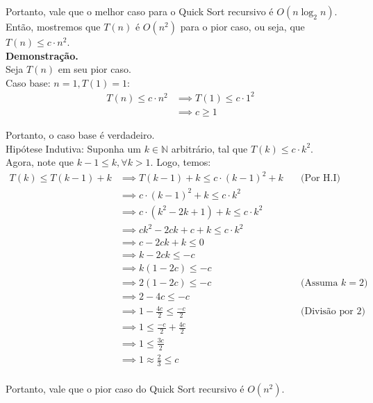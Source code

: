 Portanto, vale que o melhor caso para o Quick Sort recursivo é $O(n \log_2 n)$. \\
Então, mostremos que $T(n)$ é $O(n^2)$ para o pior caso, ou seja, que $T(n) \le c \cdot n^2$. \\
\textbf{Demonstração.} \\
Seja $T(n)$ em seu pior caso. \\
Caso base: $n = 1, T(1) = 1$:
\begin{align*}
  T(n) \le c \cdot n^2 & \implies T(1) \le c \cdot 1^2 \\
  & \implies c \ge 1 
\end{align*}

Portanto, o caso base é verdadeiro. \\
Hipótese Indutiva: Suponha um $k \in \mathbb{N}$ arbitrário, tal que $T(k) \le c \cdot k^2$. \\
Agora, note que $k - 1 \le k, \forall k > 1$. Logo, temos:
\begin{align*}
  T(k) \le T(k - 1) + k & \implies T(k - 1) + k \le c \cdot (k-1)^2 + k & \quad \text{(Por H.I)} \\
  & \implies c \cdot (k-1)^2 + k \le c \cdot k^2  \\
  & \implies c \cdot (k^2 - 2k + 1) + k \le c \cdot k^2  \\
  & \implies ck^2 - 2ck + c + k \le c \cdot k^2  \\
  & \implies c - 2ck + k \le 0  \\
  & \implies k - 2ck \le -c  \\
  & \implies k(1 - 2c) \le -c  \\
  & \implies 2(1 - 2c) \le -c &\quad \text{(Assuma $k = 2$)} \\
  & \implies 2 - 4c\le -c \\
  & \implies 1 - \frac{4c}{2} \le \frac{-c}{2} &\quad \text{(Divisão por 2)} \\
  & \implies 1 \le \frac{-c}{2} + \frac{4c}{2}\\
  & \implies 1 \le \frac{3c}{2} \\
  & \implies 1 \approx \frac{2}{3} \le c \\
\end{align*}

Portanto, vale que o pior caso do Quick Sort recursivo é $O(n^2)$.
